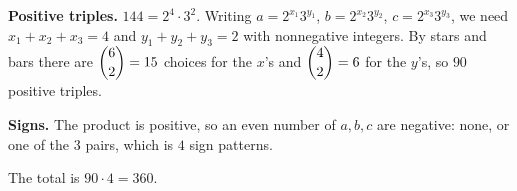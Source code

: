\textbf{Positive triples.} $144=2^4\cdot3^2$. Writing $a=2^{x_1}3^{y_1}$, $b=2^{x_2}3^{y_2}$, $c=2^{x_3}3^{y_3}$, we need $x_1+x_2+x_3=4$ and $y_1+y_2+y_3=2$ with nonnegative integers. By stars and bars there are $\dbinom{6}{2}=15$ choices for the $x$'s and $\dbinom42=6$ for the $y$'s, so $90$ positive triples.

\textbf{Signs.} The product is positive, so an even number of $a,b,c$ are negative: none, or one of the $3$ pairs, which is $4$ sign patterns.

The total is $90\cdot4=\boxed{360}$.
